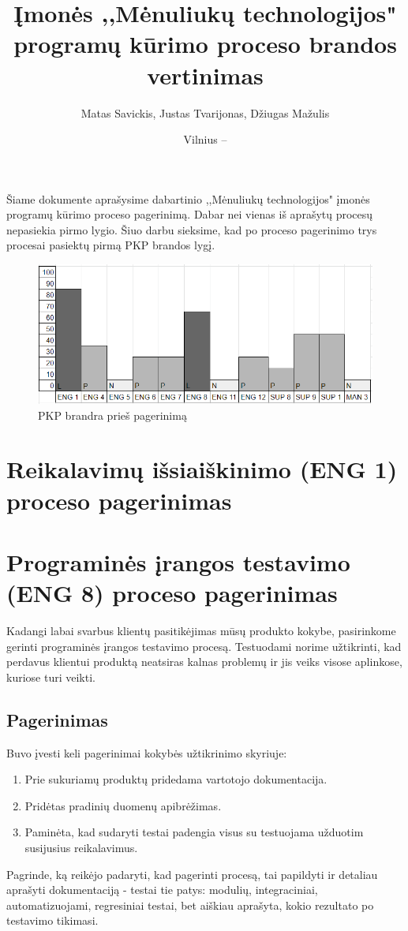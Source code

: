 \documentclass{VUMIFPSkursinis}
\title{Įmonės ,,Mėnuliukų technologijos" programų kūrimo proceso brandos vertinimas}
\author{Matas Savickis, Justas Tvarijonas, Džiugas Mažulis}
\date{Vilnius – \the\year}
\begin{document}
\maketitle

\tableofcontents

	Šiame dokumente aprašysime dabartinio ,,Mėnuliukų technologijos" įmonės programų kūrimo proceso pagerinimą. 
	Dabar nei vienas iš aprašytų procesų nepasiekia pirmo lygio.
	Šiuo darbu sieksime, kad po proceso pagerinimo trys procesai pasiektų pirmą PKP brandos lygį.
	\begin{figure}[htbp]
		\includegraphics[scale=1]{img/ProcPries}
		\caption{PKP brandra prieš pagerinimą} %
		\label{img:pkpPries}
	\end{figure}

\section{Reikalavimų išsiaiškinimo (ENG 1) proceso pagerinimas}
\section{Programinės įrangos testavimo (ENG 8) proceso pagerinimas}	
	Kadangi labai svarbus klientų pasitikėjimas mūsų produkto kokybe, pasirinkome gerinti programinės įrangos testavimo procesą. Testuodami norime užtikrinti, kad perdavus klientui produktą neatsiras kalnas problemų ir jis veiks visose aplinkose, kuriose turi veikti.
	\subsection{Pagerinimas}
	Buvo įvesti keli pagerinimai kokybės užtikrinimo skyriuje:
	\begin{enumerate}
						\item Prie sukuriamų produktų pridedama vartotojo dokumentacija.
						\item Pridėtas pradinių duomenų apibrėžimas.
						\item Paminėta, kad sudaryti testai padengia visus su testuojama užduotim susijusius reikalavimus.
	\end{enumerate}
	Pagrinde, ką reikėjo padaryti, kad pagerinti procesą, tai papildyti ir detaliau aprašyti dokumentaciją - testai tie patys: modulių, integraciniai, automatizuojami, regresiniai testai, bet aiškiau aprašyta, kokio rezultato po testavimo tikimasi.
	\newpage
	
\end{document}
